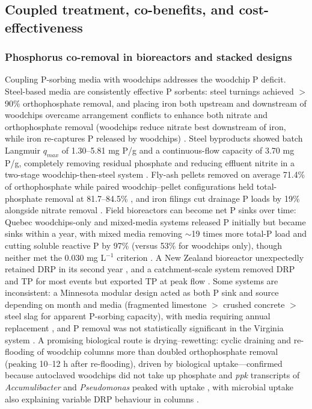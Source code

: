 \documentclass[11pt]{article}
\begin{document}
\subsection{Coupled treatment, co-benefits, and cost-effectiveness}

\subsubsection{Phosphorus co-removal in bioreactors and stacked designs}

Coupling P-sorbing media with woodchips addresses the woodchip P deficit. Steel-based media are consistently effective P sorbents: steel turnings achieved $>$90\% orthophosphate removal, and placing iron both upstream and downstream of woodchips overcame arrangement conflicts to enhance both nitrate and orthophosphate removal (woodchips reduce nitrate best downstream of iron, while iron re-captures P released by woodchips) \parencite{Goodwin2015}. Steel byproducts showed batch Langmuir $q_{max}$ of 1.30--5.81 mg P/g and a continuous-flow capacity of 3.70 mg P/g, completely removing residual phosphate and reducing effluent nitrite in a two-stage woodchip-then-steel system \parencite{Hua2016}. Fly-ash pellets removed on average 71.4\% of orthophosphate while paired woodchip--pellet configurations held total-phosphate removal at 81.7--84.5\% \parencite{Li2018b}, and iron filings cut drainage P loads by 19\% alongside nitrate removal \parencite{Oladeji2023}. Field bioreactors can become net P sinks over time: Quebec woodchips-only and mixed-media systems released P initially but became sinks within a year, with mixed media removing $\sim$19 times more total-P load and cutting soluble reactive P by 97\% (versus 53\% for woodchips only), though neither met the 0.030 mg L$^{-1}$ criterion \parencite{Husk2018}. A New Zealand bioreactor unexpectedly retained DRP in its second year \parencite{Rivas2020}, and a catchment-scale system removed DRP and TP for most events but exported TP at peak flow \parencite{Feyereisen2023}. Some systems are inconsistent: a Minnesota modular design acted as both P sink and source depending on month and media (fragmented limestone $>$ crushed concrete $>$ steel slag for apparent P-sorbing capacity), with media requiring annual replacement \parencite{Strock2025}, and P removal was not statistically significant in the Virginia system \parencite{Bock2018}. A promising biological route is drying--rewetting: cyclic draining and re-flooding of woodchip columns more than doubled orthophosphate removal (peaking 10--12 h after re-flooding), driven by biological uptake---confirmed because autoclaved woodchips did not take up phosphate and \textit{ppk} transcripts of \textit{Accumulibacter} and \textit{Pseudomonas} peaked with uptake \parencite{Zhang2024b}, with microbial uptake also explaining variable DRP behaviour in columns \parencite{Soupir2018}.
\end{document}
